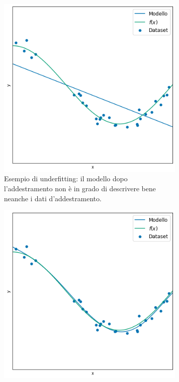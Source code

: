 \documentclass[../../main.tex]{subfiles}
\begin{document}
\begin{figure}[H]
    \centering
    \begin{subfigure}[t]{0.30\textwidth}
        \centering
        \includegraphics[width=\textwidth]{immagini/4_2/4_2_3/under.png}
        \caption{Esempio di underfitting: il modello dopo l'addestramento non è in grado di descrivere bene neanche i dati d'addestramento.}
    \end{subfigure}
    \begin{subfigure}[t]{0.30\textwidth}
        \centering
        \includegraphics[width=\textwidth]{immagini/4_2/4_2_3/good.png}

\end{subfigure}
\end{figure}
\end{document}
